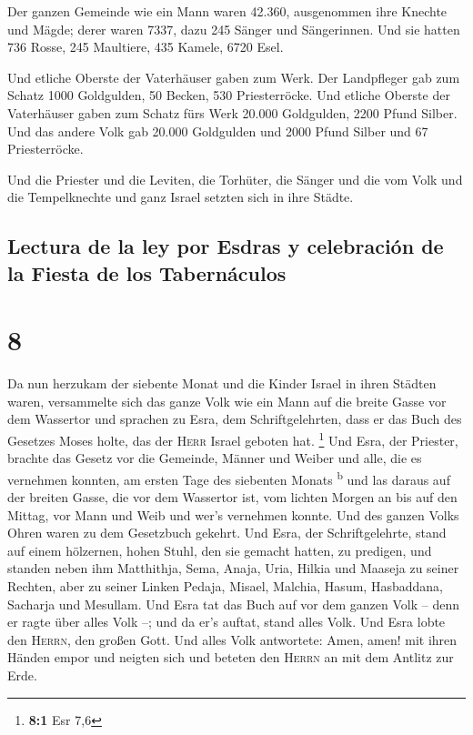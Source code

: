  Der ganzen Gemeinde wie ein Mann waren 42.360,
 ausgenommen ihre Knechte und Mägde; derer waren 7337,
dazu 245 Sänger und Sängerinnen.  Und sie hatten 736
Rosse, 245 Maultiere,  435 Kamele, 6720 Esel.

 Und etliche Oberste der Vaterhäuser gaben zum Werk. Der
Landpfleger gab zum Schatz 1000 Goldgulden, 50 Becken, 530
Priesterröcke.  Und etliche Oberste der Vaterhäuser gaben
zum Schatz fürs Werk 20.000 Goldgulden, 2200 Pfund Silber.
 Und das andere Volk gab 20.000 Goldgulden und 2000 Pfund
Silber und 67 Priesterröcke.

 Und die Priester und die Leviten, die Torhüter, die
Sänger und die vom Volk und die Tempelknechte und ganz Israel setzten
sich in ihre Städte.

\hypertarget{lectura-de-la-ley-por-esdras-y-celebraciuxf3n-de-la-fiesta-de-los-tabernuxe1culos}{%
\subsection{Lectura de la ley por Esdras y celebración de la Fiesta de
los
Tabernáculos}\label{lectura-de-la-ley-por-esdras-y-celebraciuxf3n-de-la-fiesta-de-los-tabernuxe1culos}}

\hypertarget{section-7}{%
\section{8}\label{section-7}}

 Da nun herzukam der siebente Monat und die Kinder Israel
in ihren Städten waren, versammelte sich das ganze Volk wie ein Mann auf
die breite Gasse vor dem Wassertor und sprachen zu Esra, dem
Schriftgelehrten, dass er das Buch des Gesetzes Moses holte, das der
\textsc{Herr} Israel geboten hat. \footnote{\textbf{8:1} Esr 7,6}
 Und Esra, der Priester, brachte das Gesetz vor die
Gemeinde, Männer und Weiber und alle, die es vernehmen konnten, am
ersten Tage des siebenten Monats \textsuperscript{b}  und
las daraus auf der breiten Gasse, die vor dem Wassertor ist, vom lichten
Morgen an bis auf den Mittag, vor Mann und Weib und wer's vernehmen
konnte. Und des ganzen Volks Ohren waren zu dem Gesetzbuch gekehrt.
 Und Esra, der Schriftgelehrte, stand auf einem hölzernen,
hohen Stuhl, den sie gemacht hatten, zu predigen, und standen neben ihm
Matthithja, Sema, Anaja, Uria, Hilkia und Maaseja zu seiner Rechten,
aber zu seiner Linken Pedaja, Misael, Malchia, Hasum, Hasbaddana,
Sacharja und Mesullam.  Und Esra tat das Buch auf vor dem
ganzen Volk -- denn er ragte über alles Volk --; und da er's auftat,
stand alles Volk.  Und Esra lobte den \textsc{Herrn}, den
großen Gott. Und alles Volk antwortete: Amen, amen! mit ihren Händen
empor und neigten sich und beteten den \textsc{Herrn} an mit dem Antlitz
zur Erde.

